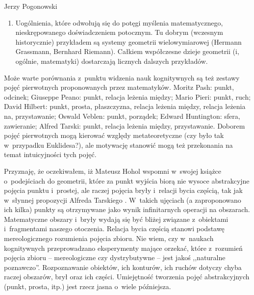 \begin{newrevplenv}{Jerzy Pogonowski}
\begin{enumerate}
\item Uogólnienia, które odwołują się do potęgi myślenia
matematycznego, nieskrępowanego doświadczeniem potocznym. Tu
dobrym (wczesnym historycznie) przykładem są systemy geometrii
wielowymiarowej (Hermann Grassmann, Bernhard Riemann). Całkiem
współczesne dzieje geometrii (i, ogólnie, matematyki) dostarczają
licznych dalszych przykładów.

\end{enumerate}

Może warte porównania z~punktu widzenia nauk kognitywnych są też
zestawy pojęć pierwotnych proponowanych przez matematyków. Moritz
Pash: punkt, odcinek; Giuseppe Peano: punkt, relacja leżenia
między; Mario Pieri: punkt, ruch; David Hilbert: punkt, prosta,
płaszczyzna, relacja leżenia między, relacja leżenia na,
przystawanie; Oswald Veblen: punkt, porządek; Edward Huntington:
sfera, zawieranie; Alfred Tarski: punkt, relacja leżenia między,
przystawanie. Doborem pojęć pierwotnych mogą kierować względy
metateoretyczne (czy było tak w~przypadku Euklidesa?), ale
motywację stanowić mogą też przekonania na temat intuicyjności
tych pojęć.

Przyznaję, że oczekiwałem, iż Mateusz Hohol wspomni w~swojej
książce o~podejściach do geometrii, które za punkt wyjścia biorą
nie wysoce abstrakcyjne pojęcia punktu i~prostej, ale raczej
pojęcia bryły i~relacji bycia częścią, tak jak w~słynnej
propozycji Alfreda Tarskiego \parencite{tarski_les_1929}. W~takich ujęciach (a
zaproponowano ich kilka) punkty są otrzymywane jako wynik
infinitarnych operacji na obszarach. Matematyczne obszary i~bryły
wydają się być bliżej związane z~obiektami i~fragmentami naszego
otoczenia. Relacja bycia częścią stanowi podstawę mereologicznego
rozumienia pojęcia zbioru. Nie wiem, czy w~naukach kognitywnych
przeprowadzano eksperymenty mające orzekać, które z~rozumień
pojęcia zbioru -- mereologiczne czy dystrybutywne -- jest jakoś
,,naturalne poznawczo''. Rozpoznawanie obiektów, ich konturów, ich
ruchów dotyczy chyba raczej obszarów, brył oraz ich części.
Umiejętność tworzenia pojęć abstrakcyjnych (punkt, prosta, itp.)
jest rzecz jasna o~wiele późniejsza.


\end{newrevplenv}
